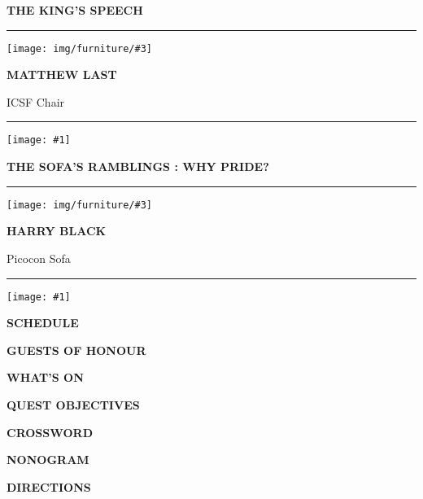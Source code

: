 \documentclass[12pt]{article}
\newcommand{\tombstone}[1]{%
  \texttt{[image: \#1]}%
}
\newcommand{\altf}[1]{{\robotocondensed\textbf{\uppercase{#1}}}}
\newcommand{\decorated}[1]{\altf{\textbullet{} #1 \textbullet{}}}
\newcommand{\head}[1]{%
  \begin{center}
    {\Huge\decorated{#1}}
  \end{center}%
}
\newcommand{\article}[3]{%
  \vspace{2.5em}\hrule
  \begin{center}
    \centering
  \begin{minipage}{0.15\textwidth}
    \texttt{[image: img/furniture/\#3]}
  \end{minipage}\hspace{1em}
  \begin{minipage}{0.3\textwidth}
    {\Large \altf{#1}\par}\vspace{-0.7\baselineskip} #2
  \end{minipage}
  \end{center}
  \vspace{1em}\hrule\vspace{1.5em}
  \tombstone{img/tombstone/sci-fi}
  \par\hfill
}
\begin{document}
%

\clearpage
%
\head{The King's Speech}
\article{Matthew Last}{ICSF Chair}{chair}
\clearpage

\head{The Sofa's Ramblings : Why Pride?}
\article{Harry Black}{Picocon Sofa}{sofa}
\clearpage
%
\head{Schedule}

\clearpage
%
\head{Guests of Honour}

\clearpage
%
\head{What's On}

\clearpage

\head{Quest Objectives}


\clearpage

\head{Crossword}


\clearpage

\head{Nonogram}

\vfill

\vfill
\clearpage

\head{Directions}

\end{document}
